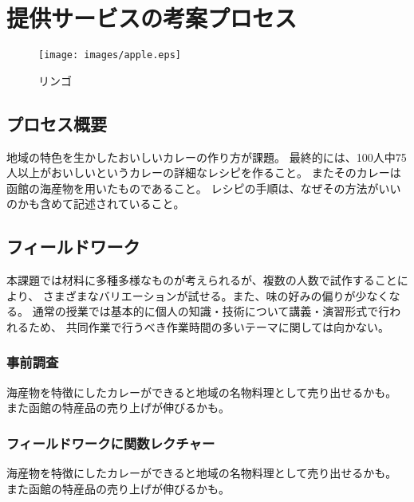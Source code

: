 \documentclass[openany,11pt,papersize]{jsbook}
\begin{document}
\chapter{提供サービスの考案プロセス}

\begin{figure}[htbp]
    \begin{center}
    \texttt{[image: images/apple.eps]}
    \end{center}
    \caption{リンゴ}
    \label{fig:apple}
\end{figure}

\section{プロセス概要}\label{sec:mokuteki}

地域の特色を生かしたおいしいカレーの作り方が課題。
最終的には、100人中75人以上がおいしいというカレーの詳細なレシピを作ること。
またそのカレーは函館の海産物を用いたものであること。
レシピの手順は、なぜその方法がいいのかも含めて記述されていること。

\section{フィールドワーク}

本課題では材料に多種多様なものが考えられるが、複数の人数で試作することにより、 
さまざまなバリエーションが試せる。また、味の好みの偏りが少なくなる。 
通常の授業では基本的に個人の知識・技術について講義・演習形式で行われるため、 
共同作業で行うべき作業時間の多いテーマに関しては向かない。


\subsection{事前調査}

海産物を特徴にしたカレーができると地域の名物料理として売り出せるかも。 
また函館の特産品の売り上げが伸びるかも。


\subsection{フィールドワークに関数レクチャー}

海産物を特徴にしたカレーができると地域の名物料理として売り出せるかも。 
また函館の特産品の売り上げが伸びるかも。
\end{document}
